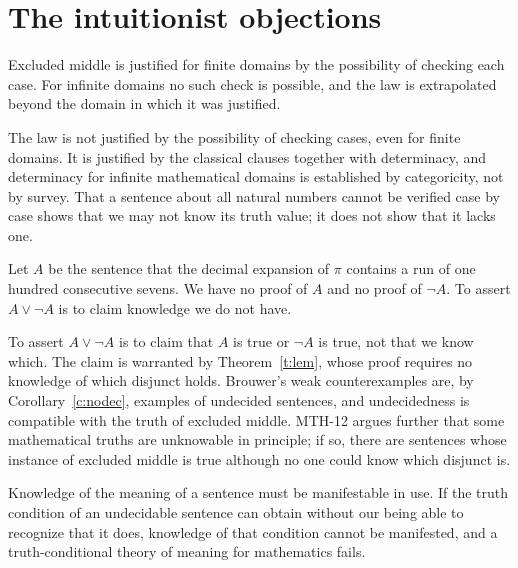 \documentclass{situationist-preprint}
\begin{document}
\section{The intuitionist objections}

\begin{objection}
Excluded middle is justified for finite domains by the possibility of checking each case. For infinite domains no such check is possible, and the law is extrapolated beyond the domain in which it was justified.
\end{objection}

\begin{reply}
The law is not justified by the possibility of checking cases, even for finite domains. It is justified by the classical clauses together with determinacy, and determinacy for infinite mathematical domains is established by categoricity, not by survey. That a sentence about all natural numbers cannot be verified case by case shows that we may not know its truth value; it does not show that it lacks one.
\end{reply}

\begin{objection}
Let $A$ be the sentence that the decimal expansion of $\pi$ contains a run of one hundred consecutive sevens. We have no proof of $A$ and no proof of $\neg A$. To assert $A \vee \neg A$ is to claim knowledge we do not have.
\end{objection}

\begin{reply}
To assert $A \vee \neg A$ is to claim that $A$ is true or $\neg A$ is true, not that we know which. The claim is warranted by Theorem~\ref{t:lem}, whose proof requires no knowledge of which disjunct holds. Brouwer's weak counterexamples are, by Corollary~\ref{c:nodec}, examples of undecided sentences, and undecidedness is compatible with the truth of excluded middle. MTH-12 argues further that some mathematical truths are unknowable in principle; if so, there are sentences whose instance of excluded middle is true although no one could know which disjunct is.
\end{reply}

\begin{objection}
Knowledge of the meaning of a sentence must be manifestable in use. If the truth condition of an undecidable sentence can obtain without our being able to recognize that it does, knowledge of that condition cannot be manifested, and a truth-conditional theory of meaning for mathematics fails.
\end{objection}
\end{document}
